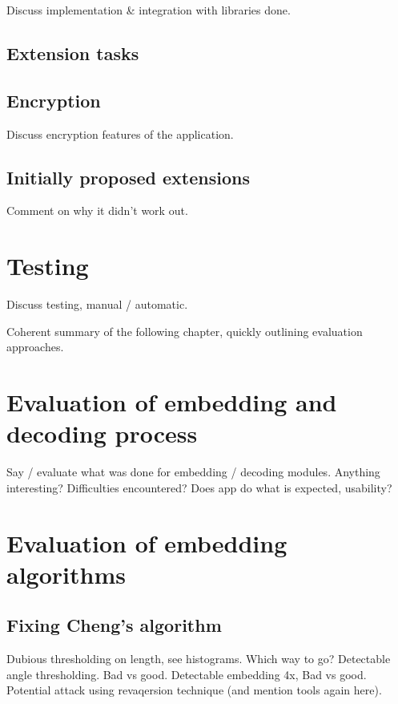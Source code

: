 \documentclass[12pt,british,twoside,notitlepage,usenames,dvipsnames,hypens,final]{report}
\numberwithin{equation}{section}
\numberwithin{figure}{section}
\begin{document}
Discuss implementation \& integration with libraries done.

\subsection{Extension tasks}

\subsection{Encryption}
Discuss encryption features of the application.

\subsection{Initially proposed extensions}
Comment on why it didn't work out.


\section{Testing}

Discuss testing, manual / automatic.


Coherent summary of the following chapter, quickly outlining evaluation approaches.

\section{Evaluation of embedding and decoding process}

Say / evaluate what was done for embedding / decoding modules. Anything interesting? Difficulties encountered? Does app do what is expected, usability?

\section{Evaluation of embedding algorithms}

\subsection{Fixing Cheng's algorithm}

Dubious thresholding on length, see histograms. Which way to go?
Detectable angle thresholding. Bad vs good.
Detectable embedding 4x, Bad vs good.
Potential attack using revaqersion technique (and mention tools again here).
\end{document}
